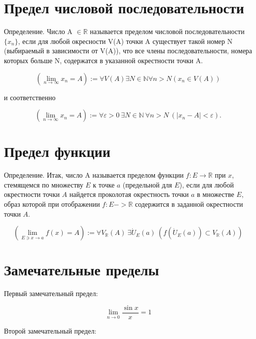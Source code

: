 \documentclass[a4paper, 12pt]{article} %
\begin{document}
\section*{Предел числовой \cite{zorich}последовательности}
Определение. Число A $\in \mathbb{R}$ называется пределом числовой последовательности $\{x_n\}$, если для любой окресности V(A) точки A существует такой номер N (выбираемый в зависимости от V(A)), что все члены последовательности, номера которых больше N, содержатся в указанной окрестности точки A.


\begin{equation}
    (\lim_{n\to\infty} x_{n} = A) := \forall V(A) \exists N \in \mathbb{N} \forall n > N (x_n \in V(A))
\end{equation}

и соответственно

\begin{equation}
    (\lim_{n \to \infty} x_{n} = A) := \forall \varepsilon > 0 \ \exists N \in \mathbb{N} \ \forall n > N \ (|x_n - A| < \varepsilon).
\end{equation}

\clearpage

\section*{Предел функции}
Определение. Итак, число A называется пределом функции $f: E \to \mathbb{R}$ при $x$, стемящемся по множеству $E$ к точке $a$ (предельной для $E$), если для любой окрестности точки $A$ найдется проколотая окрестность точки $a$ в множестве $E$, образ которой при отображении $f : E -> \mathbb{R}$ содержится в заданной окрестности точки $A$.

\begin{equation}
    (\lim_{E \ni x \to a} f(x) = A) := \forall V_\mathbb{R}(A) \ \exists \dot{U}_E(a) \ (f(\dot{U}_E(a)) \subset V_\mathbb{R}(A))
\end{equation}

\clearpage
\section*{Замечательные пределы}

Первый замечательный предел:

\begin{equation}
    \lim_{n \to 0} \frac{\sin x}{x} = 1
\end{equation}

Второй замечательный предел:
\end{document}
